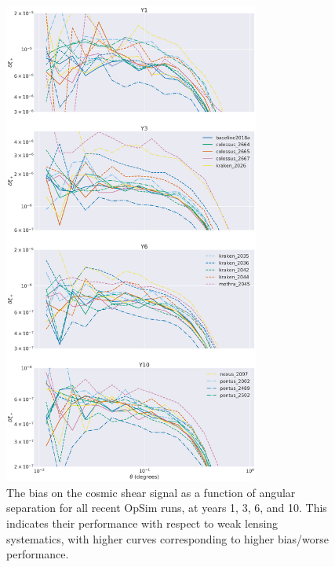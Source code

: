 \begin{figure}[hb]
    \centering
    \caption{The bias on the cosmic shear signal as a function of angular separation for all recent OpSim runs, at years 1, 3, 6, and 10. This indicates their performance with respect to weak lensing systematics, with higher curves corresponding to higher bias/worse performance.}
    \label{fig:WLSystematicsRankings}
\includegraphics[width=0.75\textwidth]{figures/WLSystematicsAllYears.png}
\end{figure}




